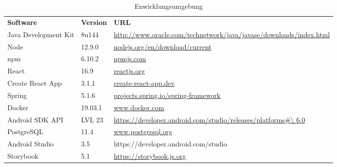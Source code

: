 \begin{table}[h]
	\centering
	\begin{tabularx}{\textwidth}{l l X}
		\rowcolor[HTML]{C0C0C0} 
		\textbf{Software} & \textbf{Version} & \textbf{URL} \\
		Java Development Kit & 8u144 & \url{http://www.oracle.com/technetwork/java/javase/downloads/index.html} \\
		\rowcolor[HTML]{E7E7E7} 
		Node & 12.9.0 & \url{nodejs.org/en/download/current} \\
		npm & 6.10.2 & \url{npmjs.com} \\
		\rowcolor[HTML]{E7E7E7} 
		React &16.9 &\url{reactjs.org}\\
		Create React App & 3.1.1 & \url{create-react-app.dev} \\
		\rowcolor[HTML]{E7E7E7} 
		Spring & 5.1.6 & \url{projects.spring.io/spring-framework} \\
		Docker & 19.03.1& \url{www.docker.com} \\
		\rowcolor[HTML]{E7E7E7} 
		Android SDK API&LVL 23 & \url {https://developer.android.com/studio/releases/platforms\#\ 6.0} \\
		PostgreSQL &11.4 & \url{www.postgresql.org} \\
		\rowcolor[HTML]{E7E7E7}
		Android Studio & 3.5 & https://developer.android.com/studio \\
		Storybook & 5.1 &\url {https://storybook.js.org} \\
		
	\end{tabularx}
	\caption{Enwicklungsumgebung}
	\label{table:entwicklungsumgebung}
\end{table}